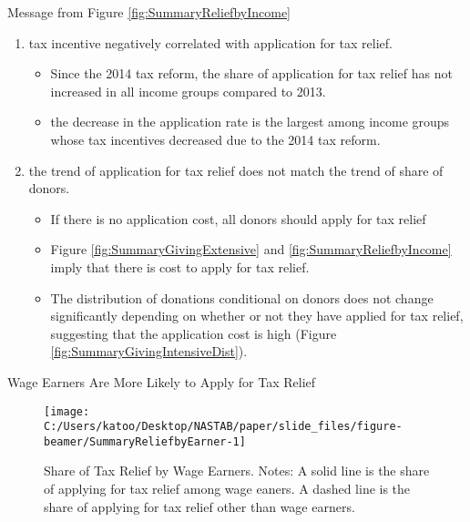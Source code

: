 \documentclass[
  ignorenonframetext,
  aspectratio=169,
]{beamer}
\providecommand{\tightlist}{%
  \setlength{\itemsep}{0pt}\setlength{\parskip}{0pt}}
\begin{document}
\begin{frame}{Message from Figure \ref{fig:SummaryReliefbyIncome}}
\protect\hypertarget{message-from-figure-reffigsummaryreliefbyincome}{}
\begin{enumerate}
\tightlist
\item
  tax incentive negatively correlated with application for tax relief.

  \begin{itemize}
  \tightlist
  \item
    Since the 2014 tax reform, the share of application for tax relief has not increased in all income groups compared to 2013.
  \item
    the decrease in the application rate is the largest among income groups whose tax incentives decreased due to the 2014 tax reform.
  \end{itemize}
\item
  the trend of application for tax relief does not match the trend of share of donors.

  \begin{itemize}
  \tightlist
  \item
    If there is no application cost, all donors should apply for tax relief
  \item
    Figure \ref{fig:SummaryGivingExtensive} and \ref{fig:SummaryReliefbyIncome} imply that there is cost to apply for tax relief.
  \item
    The distribution of donations conditional on donors does not change significantly depending on whether or not they have applied for tax relief, suggesting that the application cost is high (Figure \ref{fig:SummaryGivingIntensiveDist}).
  \end{itemize}
\end{enumerate}
\end{frame}

\begin{frame}{Wage Earners Are More Likely to Apply for Tax Relief}
\protect\hypertarget{wage-earners-are-more-likely-to-apply-for-tax-relief}{}
\begin{figure}[t]

{\centering \texttt{[image: C:/Users/katoo/Desktop/NASTAB/paper/slide\_files/figure-beamer/SummaryReliefbyEarner-1]} 

}

\caption{Share of Tax Relief by Wage Earners. Notes: A solid line is the share of applying for tax relief among wage eaners. A dashed line is the share of applying for tax relief other than wage earners.}\label{fig:SummaryReliefbyEarner}
\end{figure}
\end{frame}
\end{document}
